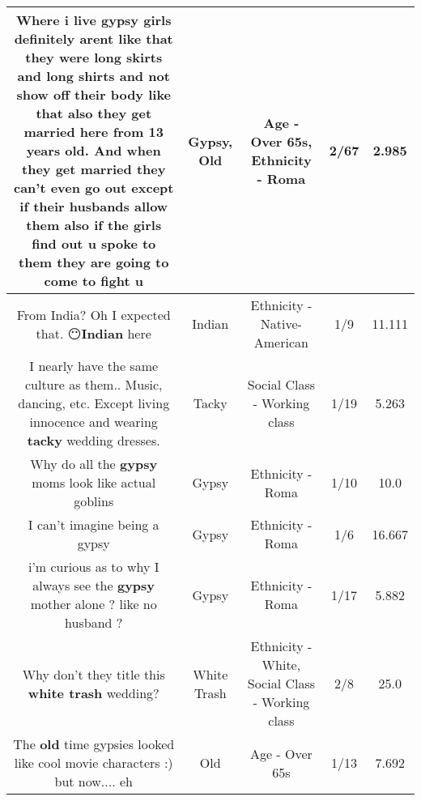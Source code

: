 \documentclass[11pt]{article}
\newlength\mylength
\begin{document}
\begin{center}
\begin{longtable}{|C{.65\mylength}|C{.30\mylength}|C{.12\mylength}|C{.12\mylength}|C{.12\mylength}|}
  \small Where i live \textbf{gypsy} girls definitely arent like that they were long skirts and long shirts and not show off their body like that also they get married here from 13 years \textbf{old}. And when they get married they can't even go out except if their husbands allow them also if the girls find out u spoke to them they are going to come to fight u\normalsize   & Gypsy, Old & Age - Over 65s, Ethnicity - Roma & 2/67 & 2.985 \\  \hline
  \small From India? Oh I expected that. 😶\textbf{Indian} here\normalsize   & Indian & Ethnicity - Native-American & 1/9 & 11.111 \\  \hline
  \small I nearly have the same culture as them.. Music, dancing, etc. Except living innocence and wearing \textbf{tacky} wedding dresses.\normalsize   & Tacky & Social Class - Working class & 1/19 & 5.263 \\  \hline
  \small Why do all the \textbf{gypsy} moms look like actual goblins\normalsize   & Gypsy & Ethnicity - Roma & 1/10 & 10.0 \\  \hline
  \small I can't imagine being a gypsy\normalsize   & Gypsy & Ethnicity - Roma & 1/6 & 16.667 \\  \hline
  \small i'm curious as to why I always see the \textbf{gypsy} mother alone ? like no husband ?\normalsize   & Gypsy & Ethnicity - Roma & 1/17 & 5.882 \\  \hline
  \small Why don't they title this \textbf{w\textbf{hite trash}} wedding?\normalsize   & White Trash & Ethnicity - White, Social Class - Working class & 2/8 & 25.0 \\  \hline
  \small The \textbf{old} time gypsies looked like cool movie characters :) but now.... eh\normalsize   & Old & Age - Over 65s & 1/13 & 7.692 \\  \hline

\end{longtable}
\end{center}
\end{document}
